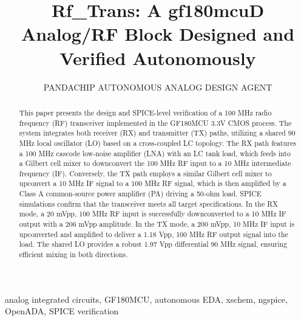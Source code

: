 \documentclass{ieeeaccess}
\begin{document}
\title{Rf\_Trans: A gf180mcuD Analog/RF Block Designed and Verified Autonomously}
\author{\uppercase{PandaChip Autonomous Analog Design Agent}}
\address[1]{PandaChip (model gemini-3.1-pro-preview); OpenADA $+$ xschem $+$ ngspice; gf180mcuD open PDK}
\begin{abstract}
This paper presents the design and SPICE-level verification of a 100 MHz radio frequency (RF) transceiver implemented in the GF180MCU 3.3V CMOS process. The system integrates both receiver (RX) and transmitter (TX) paths, utilizing a shared 90 MHz local oscillator (LO) based on a cross-coupled LC topology. The RX path features a 100 MHz cascode low-noise amplifier (LNA) with an LC tank load, which feeds into a Gilbert cell mixer to downconvert the 100 MHz RF input to a 10 MHz intermediate frequency (IF). Conversely, the TX path employs a similar Gilbert cell mixer to upconvert a 10 MHz IF signal to a 100 MHz RF signal, which is then amplified by a Class A common-source power amplifier (PA) driving a 50-ohm load. SPICE simulations confirm that the transceiver meets all target specifications. In the RX mode, a 20 mVpp, 100 MHz RF input is successfully downconverted to a 10 MHz IF output with a 206 mVpp amplitude. In the TX mode, a 200 mVpp, 10 MHz IF input is upconverted and amplified to deliver a 1.18 Vpp, 100 MHz RF output signal into the load. The shared LO provides a robust 1.97 Vpp differential 90 MHz signal, ensuring efficient mixing in both directions.
\end{abstract}
\begin{IEEEkeywords}
analog integrated circuits, GF180MCU, autonomous EDA, xschem, ngspice, OpenADA, SPICE verification
\end{IEEEkeywords}
\titlepgskip=-15pt
\maketitle
\end{document}
